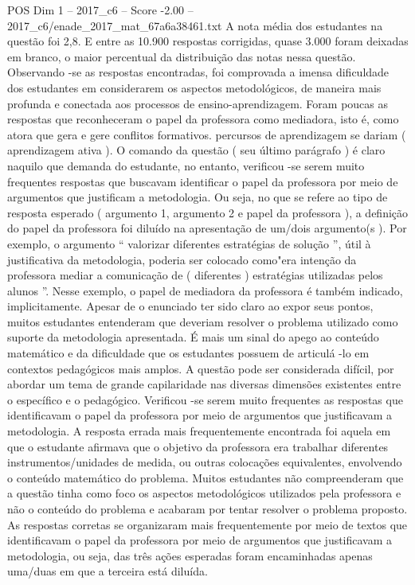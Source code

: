 \begin{textsample}{POS Dim 1 – 2017\_c6 – Score -2.00 – 2017\_c6/enade\_2017\_mat\_67a6a38461.txt}
A nota média dos estudantes na questão foi 2,8.
E entre as 10.900 respostas corrigidas, quase 3.000 foram deixadas em branco, o maior percentual da distribuição das notas nessa questão.
Observando -se as respostas encontradas, foi comprovada a imensa dificuldade dos estudantes em considerarem os aspectos metodológicos, de maneira mais profunda e conectada aos processos de ensino-aprendizagem.
Foram poucas as respostas que reconheceram o papel da professora como mediadora, isto é, como atora que gera e gere conflitos formativos. percursos de aprendizagem se dariam ( aprendizagem ativa ).
O comando da questão ( seu último parágrafo ) é claro naquilo que demanda do estudante, no entanto, verificou -se serem muito frequentes respostas que buscavam identificar o papel da professora por meio de argumentos que justificam a metodologia.
Ou seja, no que se refere ao tipo de resposta esperado ( argumento 1, argumento 2 e papel da professora ), a definição do papel da professora foi diluído na apresentação de um/dois argumento(s ).
Por exemplo, o argumento “ valorizar diferentes estratégias de solução ”, útil à justificativa da metodologia, poderia ser colocado como"era intenção da professora mediar a comunicação de ( diferentes ) estratégias utilizadas pelos alunos ”.
Nesse exemplo, o papel de mediadora da professora é também indicado, implicitamente.
Apesar de o enunciado ter sido claro ao expor seus pontos, muitos estudantes entenderam que deveriam resolver o problema utilizado como suporte da metodologia apresentada.
É mais um sinal do apego ao conteúdo matemático e da dificuldade que os estudantes possuem de articulá -lo em contextos pedagógicos mais amplos.
A questão pode ser considerada difícil, por abordar um tema de grande capilaridade nas diversas dimensões existentes entre o específico e o pedagógico.
Verificou -se serem muito frequentes as respostas que identificavam o papel da professora por meio de argumentos que justificavam a metodologia.
A resposta errada mais frequentemente encontrada foi aquela em que o estudante afirmava que o objetivo da professora era trabalhar diferentes instrumentos/unidades de medida, ou outras colocações equivalentes, envolvendo o conteúdo matemático do problema.
Muitos estudantes não compreenderam que a questão tinha como foco os aspectos metodológicos utilizados pela professora e não o conteúdo do problema e acabaram por tentar resolver o problema proposto.
As respostas corretas se organizaram mais frequentemente por meio de textos que identificavam o papel da professora por meio de argumentos que justificavam a metodologia, ou seja, das três ações esperadas foram encaminhadas apenas uma/duas em que a terceira está diluída.

\end{textsample}
